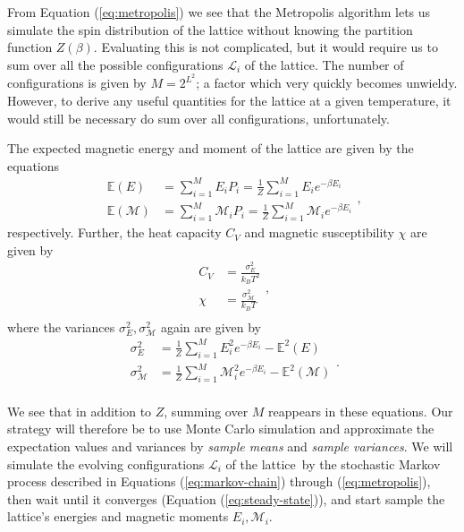 \documentclass[]{article}
\begin{document}
\vspace{5mm}

From Equation (\ref{eq:metropolis}) we see that the Metropolis algorithm lets us simulate the spin distribution of the lattice without knowing the partition function $Z(\beta)$. Evaluating this is not complicated, but it would require us to sum over all the possible configurations $\mathcal{L}_i$ of the lattice. The number of configurations is given by $M = 2^{L^2}$; a factor which very quickly becomes unwieldy. However, to derive any useful quantities for the lattice at a given temperature, it would still be necessary do sum over all configurations, unfortunately.

The expected magnetic energy and moment of the lattice are given by the equations
\begin{equation}
\begin{aligned}
	\mathbb{E}(E) &= \sum_{i=1}^{M} E_i P_i  = \frac{1}{Z} \sum_{i=1}^{M} E_i e^{-\beta E_i} \\
	\mathbb{E}(\mathcal{M}) &= \sum_{i=1}^{M} \mathcal{M}_i P_i  = \frac{1}{Z} \sum_{i=1}^{M} \mathcal{M}_i e^{-\beta E_i}
\end{aligned},
\end{equation}
respectively. Further, the heat capacity $C_V$ and magnetic susceptibility $\chi$ are given by  
\begin{equation}
\begin{aligned}
	C_V &= \frac{\sigma^2_E}{k_B T^2} \\
	\chi &= \frac{\sigma^2_\mathcal{M}}{k_B T} \\
\end{aligned},
\end{equation}
where the variances $\sigma^2_E, \sigma^2_\mathcal{M}$ again are given by
\begin{equation}
\begin{aligned}
	\sigma^2_E &= \frac{1}{Z} \sum_{i=1}^{M} E^2_i e^{-\beta E_i} - \mathbb{E}^2(E) \\
	\sigma^2_\mathcal{M} &= \frac{1}{Z} \sum_{i=1}^{M} \mathcal{M}^2_i e^{-\beta E_i} - \mathbb{E}^2(\mathcal{M}) \\
\end{aligned}.
\end{equation}

We see that in addition to $Z$, summing over $M$ reappears in these equations. Our strategy will therefore be to use Monte Carlo simulation and approximate the expectation values and variances by \textit{sample means} and \textit{sample variances}. We will simulate the evolving configurations $\mathcal{L}_i$ of the lattice by the stochastic Markov process described in Equations (\ref{eq:markov-chain}) through (\ref{eq:metropolis}), then wait until it converges (Equation (\ref{eq:steady-state})), and start sample the lattice's energies and magnetic moments $E_i, \mathcal{M}_i$.
\end{document}

